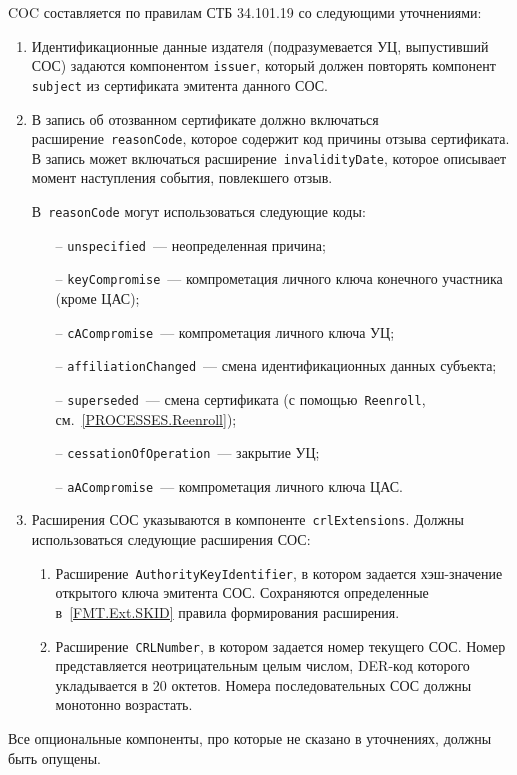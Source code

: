 COC составляется по правилам СТБ 34.101.19 со следующими уточнениями:
\begin{enumerate}

\item
Идентификационные данные издателя (подразумевается УЦ, 
выпустивший СОС) задаются компонентом \texttt{issuer}, 
который должен повторять компонент \texttt{subject} из 
сертификата эмитента данного СОС.  
%

\item

В запись об отозванном сертификате должно включаться
расширение~\texttt{reasonCode}, которое содержит код причины отзыва
сертификата.
%
В запись может включаться расширение~\texttt{invalidityDate}, которое 
описывает момент наступления события, повлекшего отзыв.

В~\texttt{reasonCode} могут использоваться следующие коды:
\begin{itemize}
\item[--]
\texttt{unspecified}~--- неопределенная причина;
\item[--]
\texttt{keyCompromise}~--- компрометация личного ключа конечного участника 
(кроме ЦАС); 
\item[--]
\texttt{cACompromise}~--- компрометация личного ключа УЦ;
\item[--]
\texttt{affiliationChanged}~--- смена идентификационных данных субъекта;
\item[--]
\texttt{superseded}~--- смена сертификата (с помощью~\texttt{Reenroll}, 
см.~\ref{PROCESSES.Reenroll}); 
\item[--]
\texttt{cessationOfOperation}~--- закрытие УЦ;
\item[--]
\texttt{aACompromise}~--- компрометация личного ключа ЦАС.
\end{itemize}

\item
Расширения СОС указываются в компоненте~\texttt{crlExtensions}.
Должны использоваться следующие расширения СОС:
\begin{enumerate}
\item 
Расширение~\texttt{AuthorityKeyIdentifier}, в котором задается 
хэш-значение открытого ключа эмитента СОС. 
%
Сохраняются определенные в~\ref{FMT.Ext.SKID} правила формирования 
расширения.

\item
Расширение~\texttt{CRLNumber}, в котором задается номер текущего СОС.
Номер представляется неотрицательным целым числом, 
DER-код которого укладывается в 20 октетов. 
Номера последовательных СОС должны монотонно возрастать.
\end{enumerate}

\end{enumerate}

Все опциональные компоненты, про которые не сказано в уточнениях, 
должны быть опущены.
